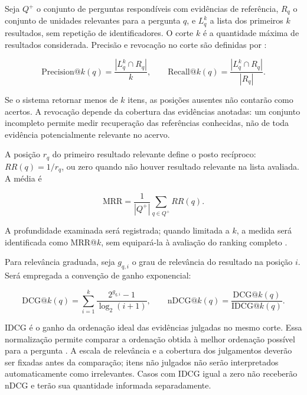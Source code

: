 Seja $Q^+$ o conjunto de perguntas respondíveis com evidências de referência, $R_q$ o conjunto de unidades relevantes para a pergunta $q$, e $L_q^k$ a lista dos primeiros $k$ resultados, sem repetição de identificadores. O corte $k$ é a quantidade máxima de resultados considerada. Precisão e revocação no corte são definidas por \parencite{manningEtAl2008informationRetrieval}:

\begin{equation}
\mathrm{Precision@}k(q)=\frac{|L_q^k\cap R_q|}{k},\qquad
\mathrm{Recall@}k(q)=\frac{|L_q^k\cap R_q|}{|R_q|}.
\end{equation}

Se o sistema retornar menos de $k$ itens, as posições ausentes não contarão como acertos. A revocação depende da cobertura das evidências anotadas: um conjunto incompleto permite medir recuperação das referências conhecidas, não de toda evidência potencialmente relevante no acervo.

A posição $r_q$ do primeiro resultado relevante define o posto recíproco: $RR(q)=1/r_q$, ou zero quando não houver resultado relevante na lista avaliada. A média é

\begin{equation}
\mathrm{MRR}=\frac{1}{|Q^+|}\sum_{q\in Q^+}RR(q).
\end{equation}

A profundidade examinada será registrada; quando limitada a $k$, a medida será identificada como MRR@$k$, sem equipará-la à avaliação do ranking completo \parencite{thakurEtAl2021beir}.

Para relevância graduada, seja $g_{q,i}$ o grau de relevância do resultado na posição $i$. Será empregada a convenção de ganho exponencial:

\begin{equation}
\mathrm{DCG@}k(q)=\sum_{i=1}^{k}\frac{2^{g_{q,i}}-1}{\log_2(i+1)},\qquad
\mathrm{nDCG@}k(q)=\frac{\mathrm{DCG@}k(q)}{\mathrm{IDCG@}k(q)}.
\end{equation}

IDCG é o ganho da ordenação ideal das evidências julgadas no mesmo corte. Essa normalização permite comparar a ordenação obtida à melhor ordenação possível para a pergunta \parencite{manningEtAl2008informationRetrieval}. A escala de relevância e a cobertura dos julgamentos deverão ser fixadas antes da comparação; itens não julgados não serão interpretados automaticamente como irrelevantes. Casos com IDCG igual a zero não receberão nDCG e terão sua quantidade informada separadamente.

